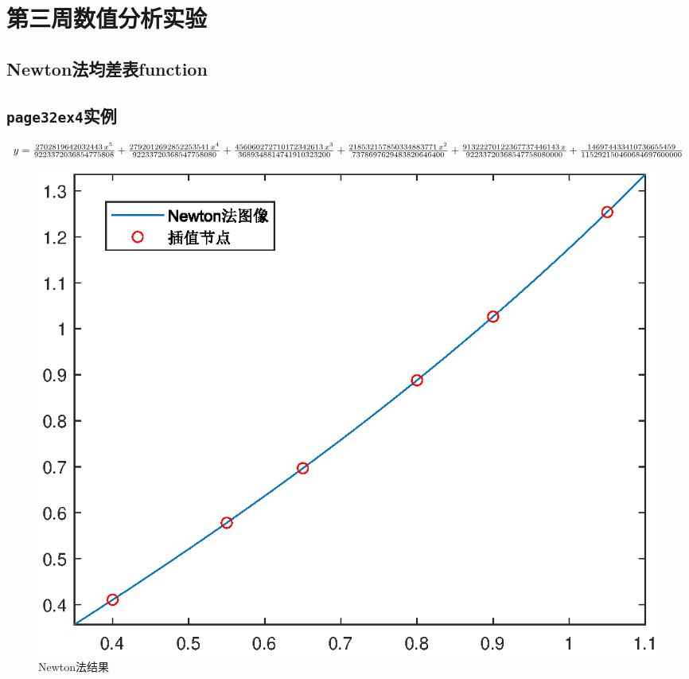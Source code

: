 \section{第三周数值分析实验}
\subsection{Newton法均差表function}

\subsection{\texttt{page32ex4}实例}

\qa $y=\frac{2702819642032443\,x^5}{9223372036854775808}+\frac{2792012692852253541\,x^4}{92233720368547758080}+\frac{456060272710172342613\,x^3}{3689348814741910323200}\\+\frac{218532157850334883771\,x^2}{7378697629483820646400}+\frac{91322270122367737446143\,x}{92233720368547758080000}+\frac{146974433410736655459}{115292150460684697600000}$
\begin{figure}[H]
	\centering
	\includegraphics[width = 0.6\linewidth]{day3/newton.eps}
	\caption{Newton法结果}
\end{figure}

